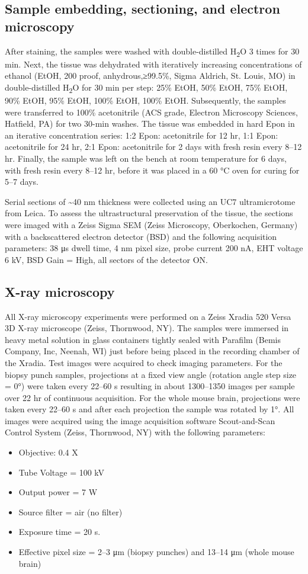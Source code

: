 \documentclass{article}
\begin{document}
\subsection*{Sample embedding, sectioning, and electron microscopy}
After staining, the samples were washed with double-distilled H\textsubscript{2}O 3 times for 30 min. Next, the tissue was dehydrated with iteratively increasing concentrations of ethanol (EtOH, 200 proof, anhydrous,≥99.5\%, Sigma Aldrich, St. Louis, MO) in double-distilled H\textsubscript{2}O for 30 min per step: 25\% EtOH, 50\% EtOH, 75\% EtOH, 90\% EtOH, 95\% EtOH, 100\% EtOH, 100\% EtOH. Subsequently, the samples were transferred to 100\% acetonitrile (ACS grade, Electron Microscopy Sciences, Hatfield, PA) for two 30-min washes. The tissue was embedded in hard Epon in an iterative concentration series: 1:2 Epon: acetonitrile for 12 hr, 1:1 Epon: acetonitrile for 24 hr, 2:1 Epon: acetonitrile for 2 days with fresh resin every 8–12 hr. Finally, the sample was left on the bench at room temperature for 6 days, with fresh resin every 8–12 hr, before it was placed in a 60 °C oven for curing for 5–7 days.

Serial sections of \textasciitilde40 nm thickness were collected using an UC7 ultramicrotome from Leica. To assess the ultrastructural preservation of the tissue, the sections were imaged with a Zeiss Sigma SEM (Zeiss Microscopy, Oberkochen, Germany) with a backscattered electron detector (BSD) and the following acquisition parameters: 38 μs dwell time, 4 nm pixel size, probe current 200 nA, EHT voltage 6 kV, BSD Gain = High, all sectors of the detector ON.

\subsection*{X-ray microscopy}
All X-ray microscopy experiments were performed on a Zeiss Xradia 520 Versa 3D X-ray microscope (Zeiss, Thornwood, NY). The samples were immersed in heavy metal solution in glass containers tightly sealed with Parafilm (Bemis Company, Inc, Neenah, WI) just before being placed in the recording chamber of the Xradia. Test images were acquired to check imaging parameters. For the biopsy punch samples, projections at a fixed view angle (rotation angle step size = 0°) were taken every 22–60 s resulting in about 1300–1350 images per sample over 22 hr of continuous acquisition. For the whole mouse brain, projections were taken every 22–60 s and after each projection the sample was rotated by 1°. All images were acquired using the image acquisition software Scout-and-Scan Control System (Zeiss, Thornwood, NY) with the following parameters:
\begin{itemize}
\item Objective: 0.4 X
\item Tube Voltage = 100 kV
\item Output power = 7 W
\item Source filter = air (no filter)
\item Exposure time = 20 s.
\item Effective pixel size = 2–3 μm (biopsy punches) and 13–14 μm (whole mouse brain)
\end{itemize}
\end{document}
